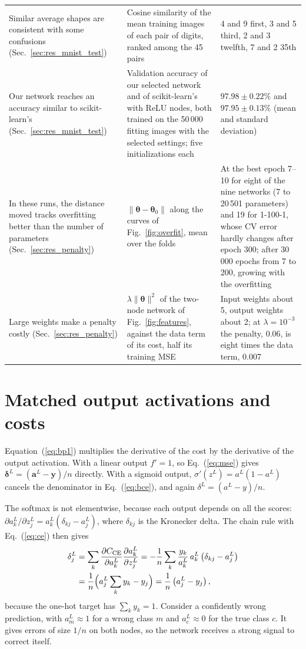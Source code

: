 \documentclass[aps,prb,reprint,superscriptaddress,nofootinbib,longbibliography,floatfix]{revtex4-2}
\begin{document}
\begin{table}[tb]
\begin{ruledtabular}
\begin{tabular}{p{}p{}p{}}
Similar average shapes are consistent with some confusions (Sec.~\ref{sec:res_mnist_test}) & Cosine similarity of the mean training images of each pair of digits, ranked among the 45 pairs & 4 and 9 first, 3 and 5 third, 2 and 3 twelfth, 7 and 2 35th \\
Our network reaches an accuracy similar to scikit-learn's (Sec.~\ref{sec:res_mnist_test}) & Validation accuracy of our selected network and of scikit-learn's with ReLU nodes, both trained on the 50\,000 fitting images with the selected settings; five initializations each & $97.98\pm0.22\%$ and $97.95\pm0.13\%$ (mean and standard deviation) \\
In these runs, the distance moved tracks overfitting better than the number of parameters (Sec.~\ref{sec:res_penalty}) & $\|\bm\theta-\bm\theta_0\|$ along the curves of Fig.~\ref{fig:overfit}, mean over the folds & At the best epoch 7--10 for eight of the nine networks (7 to 20\,501 parameters) and 19 for 1-100-1, whose CV error hardly changes after epoch 300; after 30\,000 epochs from 7 to 200, growing with the overfitting \\
Large weights make a penalty costly (Sec.~\ref{sec:res_penalty}) & $\lambda\|\bm\theta\|^2$ of the two-node network of Fig.~\ref{fig:features}, against the data term of its cost, half its training MSE & Input weights about 5, output weights about 2; at $\lambda=10^{-3}$ the penalty, 0.06, is eight times the data term, 0.007 \\
\end{tabular}
\end{ruledtabular}
\end{table}

\section{Matched output activations and costs}\label{app:pairs}
Equation~(\ref{eq:bp1}) multiplies the derivative of the cost by the derivative of the output activation. With a linear output $f'=1$, so Eq.~(\ref{eq:mse}) gives $\bm{\delta}^L=(\bm{a}^L-\bm{y})/n$ directly. With a sigmoid output, $\sigma'(z^L)=a^L(1-a^L)$ cancels the denominator in Eq.~(\ref{eq:bce}), and again $\delta^L=(a^L-y)/n$.

The softmax is not elementwise, because each output depends on all the scores: $\partial a_k^L/\partial z_j^L=a_k^L\left(\delta_{kj}-a_j^L\right)$, where $\delta_{kj}$ is the Kronecker delta. The chain rule with Eq.~(\ref{eq:ce}) then gives
\begin{align}
\delta_j^L&=\sum_k\frac{\partial C_{\rm CE}}{\partial a_k^L}\frac{\partial a_k^L}{\partial z_j^L}
=-\frac1n\sum_k\frac{y_k}{a_k^L}\,a_k^L\left(\delta_{kj}-a_j^L\right)\nonumber\\
&=\frac1n\Bigl(a_j^L\sum_k y_k-y_j\Bigr)=\frac1n\left(a_j^L-y_j\right),
\end{align}
because the one-hot target has $\sum_k y_k=1$. Consider a confidently wrong prediction, with $a_m^L\approx1$ for a wrong class $m$ and $a_c^L\approx0$ for the true class $c$. It gives errors of size $1/n$ on both nodes, so the network receives a strong signal to correct itself.
\end{document}
